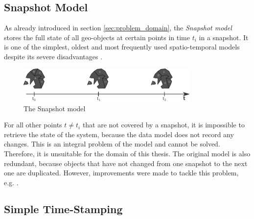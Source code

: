 
\subsection{Snapshot Model} %
\label{sub:snapshot_model}

As already introduced in section \ref{sec:problem_domain}, the \emph{Snapshot model} stores the full state of all geo-objects at certain points in time $t_i$ in a snapshot. It is one of the simplest, oldest and most frequently used spatio-temporal models despite its severe disadvantages
\cite{Langran1988frameworktgis}.

\begin{figure}[H]
  \vspace{1em}
  \centering
  \includegraphics[width=0.8\textwidth]{graphics/basics/stdm/snapshot_model}
  \caption{The Snapshot model \cite{Langran1988frameworktgis}}
  \label{fig:snapshot_model}
\end{figure}

For all other points $t \neq t_i$ that are not covered by a snapshot, it is impossible to retrieve the state of the system, because the data model does not record any changes. This is an integral problem of the model and cannot be solved. Therefore, it is unsuitable for the domain of this thesis. The original model is also redundant, because objects that have not changed from one snapshot to the next one are duplicated. However, improvements were made to tackle this problem, e.g. \cite{armenakis92}.


\subsection{Simple Time-Stamping} %
\label{sub:simple_time_stamping}

